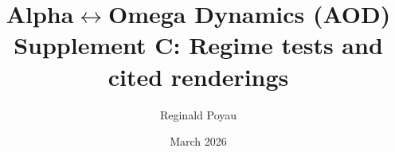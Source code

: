 \title{Alpha$\leftrightarrow$Omega Dynamics (AOD)\\
\large Supplement C: Regime tests and cited renderings}
\author{Reginald Poyau}
\date{March 2026}
\maketitle
